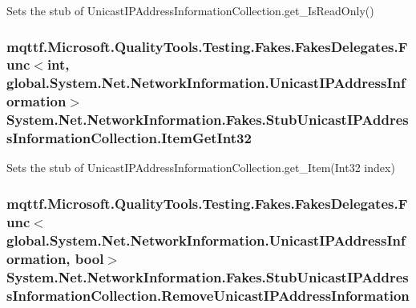 Sets the stub of Unicast\-I\-P\-Address\-Information\-Collection.\-get\-\_\-\-Is\-Read\-Only()

\hypertarget{class_system_1_1_net_1_1_network_information_1_1_fakes_1_1_stub_unicast_i_p_address_information_collection_a4da7763e80708241ede28ae0f0805029}{
\subsubsection[{Item\-Get\-Int32}]{\setlength{\rightskip}{0pt plus 5cm}mqttf.\-Microsoft.\-Quality\-Tools.\-Testing.\-Fakes.\-Fakes\-Delegates.\-Func$<$int, global.\-System.\-Net.\-Network\-Information.\-Unicast\-I\-P\-Address\-Information$>$ System.\-Net.\-Network\-Information.\-Fakes.\-Stub\-Unicast\-I\-P\-Address\-Information\-Collection.\-Item\-Get\-Int32}}\label{class_system_1_1_net_1_1_network_information_1_1_fakes_1_1_stub_unicast_i_p_address_information_collection_a4da7763e80708241ede28ae0f0805029}


Sets the stub of Unicast\-I\-P\-Address\-Information\-Collection.\-get\-\_\-\-Item(\-Int32 index)

\hypertarget{class_system_1_1_net_1_1_network_information_1_1_fakes_1_1_stub_unicast_i_p_address_information_collection_a7bd36c04089d01eaa52807cbf6ba32ed}{
\subsubsection[{Remove\-Unicast\-I\-P\-Address\-Information}]{\setlength{\rightskip}{0pt plus 5cm}mqttf.\-Microsoft.\-Quality\-Tools.\-Testing.\-Fakes.\-Fakes\-Delegates.\-Func$<$global.\-System.\-Net.\-Network\-Information.\-Unicast\-I\-P\-Address\-Information, bool$>$ System.\-Net.\-Network\-Information.\-Fakes.\-Stub\-Unicast\-I\-P\-Address\-Information\-Collection.\-Remove\-Unicast\-I\-P\-Address\-Information}}\label{class_system_1_1_net_1_1_network_information_1_1_fakes_1_1_stub_unicast_i_p_address_information_collection_a7bd36c04089d01eaa52807cbf6ba32ed}


